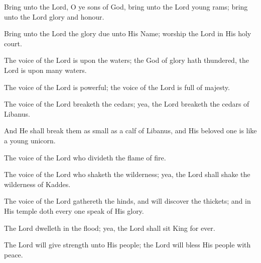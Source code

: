Bring unto the Lord, O ye sons of God, bring unto the Lord young rams; bring unto the Lord glory and honour.

Bring unto the Lord the glory due unto His Name; worship the Lord in His holy court.

The voice of the Lord is upon the waters; the God of glory hath thundered, the Lord is upon many waters.

The voice of the Lord is powerful; the voice of the Lord is full of majesty.

The voice of the Lord breaketh the cedars; yea, the Lord breaketh the cedars of Libanus.

And He shall break them as small as a calf of Libanus, and His beloved one is like a young unicorn.

The voice of the Lord who divideth the flame of fire.

The voice of the Lord who shaketh the wilderness; yea, the Lord shall shake the wilderness of Kaddes.

The voice of the Lord gathereth the hinds, and will discover the thickets; and in His temple doth every one speak of His glory.

The Lord dwelleth in the flood; yea, the Lord shall sit King for ever.

The Lord will give strength unto His people; the Lord will bless His people with peace.
